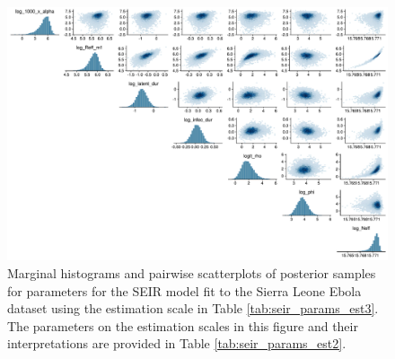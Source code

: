 \begin{figure}[htbp]
	\centering
	\includegraphics[width=\linewidth]{figures/sln_pairs_t1}
	\caption[Posterior scatterplots for transformed Sierra Leone SEIR model parameters.]{Marginal histograms and pairwise scatterplots of posterior samples for parameters for the SEIR model fit to the Sierra Leone Ebola dataset using the estimation scale in Table \ref{tab:seir_params_est3}. The parameters on the estimation scales in this figure and their interpretations are provided in Table \ref{tab:seir_params_est2}.} 
	\label{fig:slpairs2}
\end{figure}

